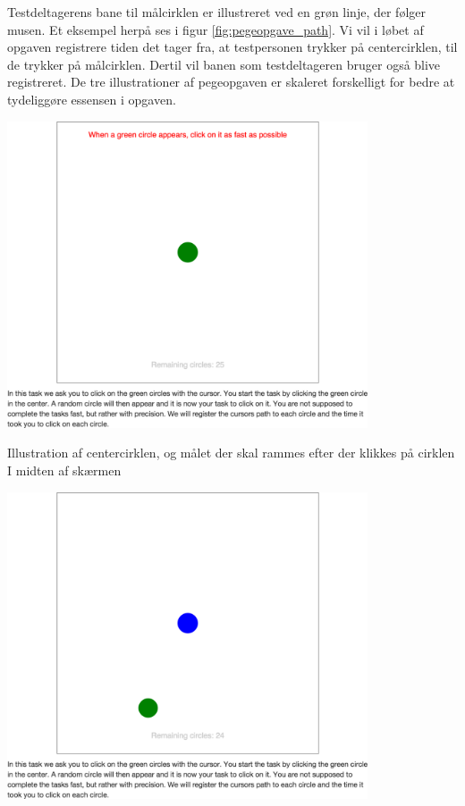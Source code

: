 Testdeltagerens bane til målcirklen er illustreret ved en grøn linje, der følger musen. Et eksempel herpå ses i figur \ref{fig:pegeopgave_path}. Vi vil i løbet af opgaven registrere tiden det tager fra, at testpersonen trykker på centercirklen, til de trykker på målcirklen. Dertil vil banen som testdeltageren bruger også blive registreret. De tre illustrationer af pegeopgaven er skaleret forskelligt for bedre at tydeliggøre essensen i opgaven.

\begin{minipage}[t]{.5\linewidth}
\centering
\vspace{0pt}
\includegraphics[width=0.8\textwidth, trim = 8cm 20cm 8cm 15cm, clip]{images/screenshots/ex_step_6_pointing_start}
\label{fig:pegeopgave_start}
\caption{Illustration af centercirklen, og målet der skal rammes efter der klikkes på cirklen I midten af skærmen}
\includegraphics[width=0.8\textwidth, trim = 8cm 8cm 8cm 15cm, clip]{images/screenshots/ex_step_6_pointing_target_1}

\end{minipage}
